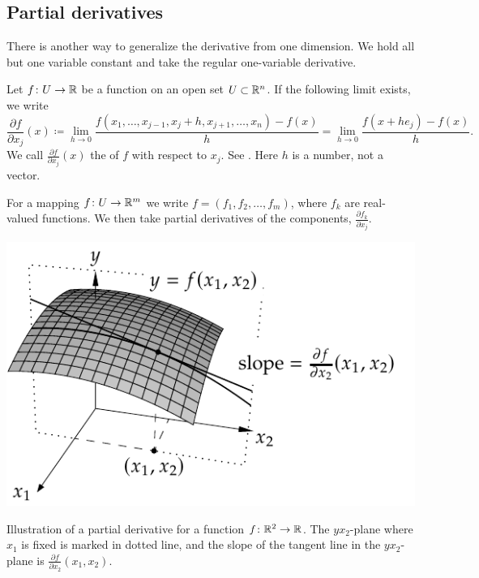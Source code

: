 \subsection{Partial derivatives}

There is another way to generalize the derivative from one dimension.
We hold all but one variable constant and take the regular
one-variable derivative.

\begin{defn}
Let
$f \colon U \to {\mathbb{R}}$ be a function on an open set $U \subset {\mathbb{R}}^n$.
If the following limit exists, we write
\begin{equation*}
\frac{\partial f}{\partial x_j} (x) \coloneqq 
\lim_{h\to 0}\frac{f(x_1,\ldots,x_{j-1},x_j+h,x_{j+1},\ldots,x_n)-f(x)}{h}
=
\lim_{h\to 0}\frac{f(x+h e_j)-f(x)}{h} .
\end{equation*}
We call 
$\frac{\partial f}{\partial x_j} (x)$ the \emph{}
of $f$
with respect to $x_j$.  %
See .
Here $h$ is a number, not a vector.

For a mapping $f \colon U \to {\mathbb{R}}^m$ we write
$f = (f_1,f_2,\ldots,f_m)$, where $f_k$ are real-valued
functions.  We then take partial derivatives of
the components,
$\frac{\partial f_k}{\partial x_j}$.
\end{defn}

\begin{myfigureht}
\includegraphics{figures/svpartder}
\caption{Illustration of a partial derivative for a function $f \colon {\mathbb{R}}^2
\to {\mathbb{R}}$.  The $yx_2$-plane where $x_1$ is fixed is marked in dotted line,
and the slope of the tangent line in the $yx_2$-plane is
$\frac{\partial f}{\partial x_2}(x_1,x_2)$.\label{fig:svpartder}}
\end{myfigureht}

